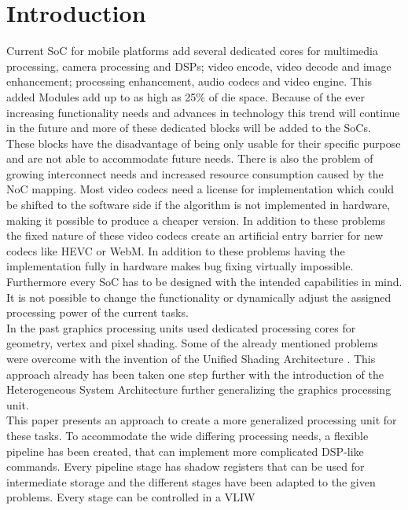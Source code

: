 \documentclass[11pt,twocolumn,technote,a4paper]{IEEEtran}
\begin{document}
\section{Introduction}
\label{sec:introduction}
Current SoC for mobile platforms add several dedicated cores for multimedia
processing, camera processing and DSPs\cite{anand_qualcomm}; video encode,
video decode and image enhancement\cite{kanter_medfield}; processing
enhancement, audio codecs and video engine\cite{anand_allwinner}. This added
Modules add up to as high as 25\% of die space\cite{anand_qualcomm}. Because
of the ever increasing functionality needs and advances in technology this
trend will continue in the future and more of these dedicated blocks will be
added to the SoCs.\\
These blocks have the disadvantage of being only usable for their specific
purpose and are not able to accommodate future needs. There is also the
problem of growing interconnect needs and increased resource consumption
caused by the NoC mapping\cite{walter_era_2009}. Most video codecs
need a license for implementation which could be shifted to the software side
if the algorithm is not implemented in hardware, making it possible to produce
a cheaper version. In addition to these problems the fixed nature of these
video codecs create an artificial entry barrier for new codecs like HEVC or
WebM. In addition to these problems having the implementation fully in
hardware makes bug fixing virtually impossible. Furthermore every SoC has to
be designed with the intended capabilities in mind. It is not possible to
change the functionality or dynamically adjust the assigned processing power
of the current tasks.\\
In the past graphics processing units used dedicated processing cores for
geometry, vertex and pixel shading. Some of the already mentioned problems
were overcome with the invention of the Unified Shading Architecture
\cite{wiki_unified_2014}. This approach already has been taken one step
further with the introduction of the Heterogeneous System Architecture
\cite{amd_hsa} further generalizing the graphics processing unit.\\
This paper presents an approach to create a more generalized processing unit
for these tasks. To accommodate the wide differing processing needs, a
flexible pipeline has been created, that can implement more complicated 
DSP-like commands. Every pipeline stage has shadow registers that can
be used for intermediate storage and the different stages have been
adapted to the given problems. Every stage can be controlled in a VLIW
\end{document}
